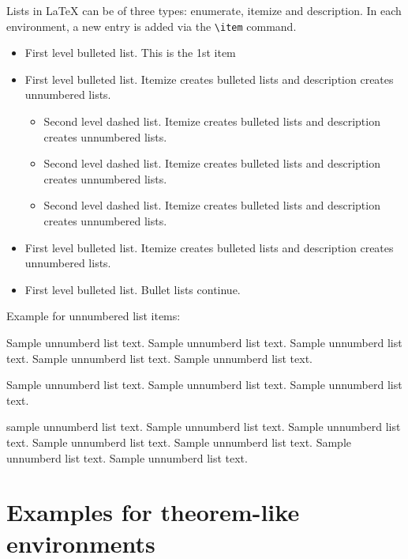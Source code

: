 \documentclass[unnumsec,webpdf,contemporary,large]{oup-authoring-template}%
\theoremstyle{thmstyleone}%
\theoremstyle{thmstyletwo}%
\theoremstyle{thmstylethree}%
\begin{document}
Lists in \LaTeX{} can be of three types: enumerate, itemize and description.
In each environment, a new entry is added via the \verb+\item+ command.
\begin{itemize}
	\item First level bulleted list. This is the 1st item

	\item First level bulleted list. Itemize creates bulleted lists and description creates unnumbered lists.
	      \begin{itemize}
		      \item Second level dashed list. Itemize creates bulleted lists and description creates unnumbered lists.

		      \item Second level dashed list. Itemize creates bulleted lists and description creates unnumbered lists.

		      \item Second level dashed list. Itemize creates bulleted lists and description creates unnumbered lists.
	      \end{itemize}

	\item First level bulleted list. Itemize creates bulleted lists and description creates unnumbered lists.

	\item First level bulleted list. Bullet lists continue.
\end{itemize}

\noindent
Example for unnumbered list items:

\begin{unlist}
	\item Sample unnumberd list text. Sample unnumberd list text. Sample unnumberd list text. Sample unnumberd list text. Sample unnumberd list text.

	\item Sample unnumberd list text. Sample unnumberd list text. Sample unnumberd list text.

	\item sample unnumberd list text. Sample unnumberd list text. Sample unnumberd list text. Sample unnumberd list text. Sample unnumberd list text. Sample unnumberd list text. Sample unnumberd list text.
\end{unlist}

\section{Examples for theorem-like environments}\label{sec10}
\end{document}
